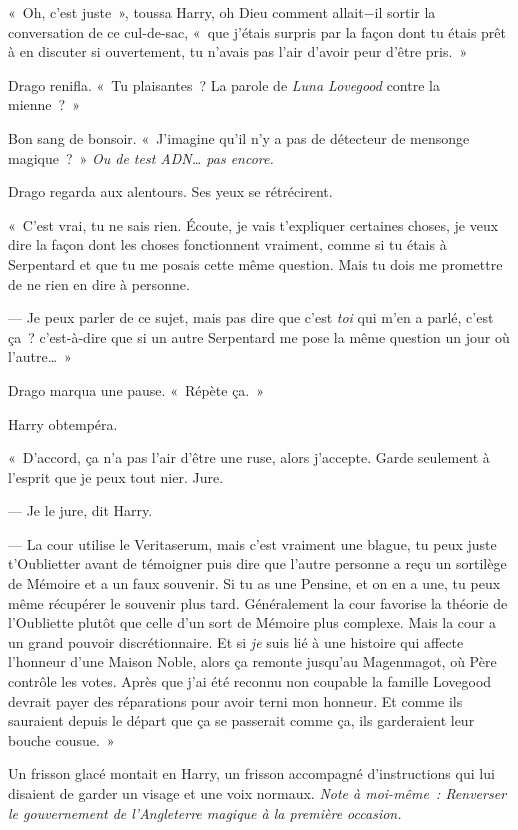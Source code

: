 «~Oh, c'est juste~», toussa Harry, oh Dieu comment allait−il sortir la conversation de ce cul-de-sac, «~que j'étais surpris par la façon dont tu étais prêt à en discuter si ouvertement, tu n'avais pas l'air d'avoir peur d'être pris.~»

Drago renifla. «~Tu plaisantes~? La parole de \emph{Luna Lovegood} contre la mienne~?~»

Bon sang de bonsoir. «~J'imagine qu'il n'y a pas de détecteur de mensonge magique~?~» \emph{Ou de test ADN… pas encore.}

Drago regarda aux alentours. Ses yeux se rétrécirent.

«~C'est vrai, tu ne sais rien. Écoute, je vais t'expliquer certaines choses, je veux dire la façon dont les choses fonctionnent vraiment, comme si tu étais à Serpentard et que tu me posais cette même question. Mais tu dois me promettre de ne rien en dire à personne.

--- Je peux parler de ce sujet, mais pas dire que c'est \emph{toi} qui m'en a parlé, c'est ça~? c'est-à-dire que si un autre Serpentard me pose la même question un jour où l'autre…~»

Drago marqua une pause. «~Répète ça.~»

Harry obtempéra.

«~D'accord, ça n'a pas l'air d'être une ruse, alors j'accepte. Garde seulement à l'esprit que je peux tout nier. Jure.

--- Je le jure, dit Harry.

--- La cour utilise le Veritaserum, mais c'est vraiment une blague, tu peux juste t'Oublietter avant de témoigner puis dire que l'autre personne a reçu un sortilège de Mémoire et a un faux souvenir. Si tu as une Pensine, et on en a une, tu peux même récupérer le souvenir plus tard. Généralement la cour favorise la théorie de l'Oubliette plutôt que celle d'un sort de Mémoire plus complexe. Mais la cour a un grand pouvoir discrétionnaire. Et si \emph{je} suis lié à une histoire qui affecte l'honneur d'une Maison Noble, alors ça remonte jusqu'au Magenmagot, où Père contrôle les votes. Après que j'ai été reconnu non coupable la famille Lovegood devrait payer des réparations pour avoir terni mon honneur. Et comme ils sauraient depuis le départ que ça se passerait comme ça, ils garderaient leur bouche cousue.~»

Un frisson glacé montait en Harry, un frisson accompagné d'instructions qui lui disaient de garder un visage et une voix normaux. \emph{Note à moi-même~: Renverser le gouvernement de l'Angleterre magique à la première occasion.}


